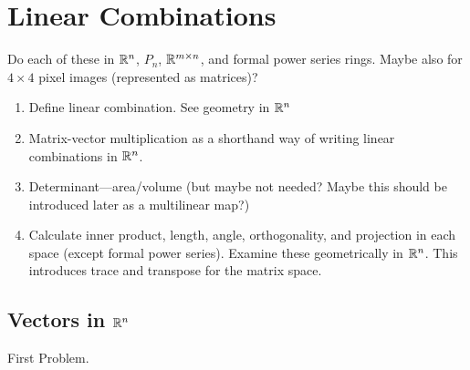 \chapter{Linear Combinations}
Do each of these in $\mathbb{R}^n$, $P_n$, $\mathbb{R}^{m\times n}$, and formal power
  series rings.  Maybe also for $4\times 4$ pixel images (represented
  as matrices)?
\begin{enumerate}
\item Define linear combination.  See geometry in $\mathbb{R}^n$
\item Matrix-vector multiplication as a shorthand way of writing
  linear combinations in $\mathbb{R}^n$.
\item Determinant---area/volume (but maybe not needed?  Maybe this
  should be introduced later as a multilinear map?)
\item Calculate inner product, length, angle, orthogonality, and
  projection in each space (except formal power series).  Examine
  these geometrically in $\mathbb{R}^n$.  This introduces trace and transpose
  for the matrix space.
\end{enumerate}

\section{Vectors in $\mathbb{R}^n$}

\begin{problem}
  First Problem.
\end{problem}


